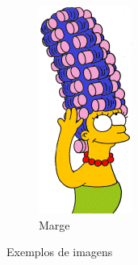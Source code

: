 \documentclass[journal]{IEEEtran}
\begin{document}
\begin{figure}[!htb]
\begin{subfigure}[b]{0.15\textwidth}
        \includegraphics[width=\textwidth]{marge001}
        \caption{Marge}
        \label{fig:marge}
    \end{subfigure}
    \caption{Exemplos de imagens}\label{fig:exemplos}
\end{figure}
\end{document}
